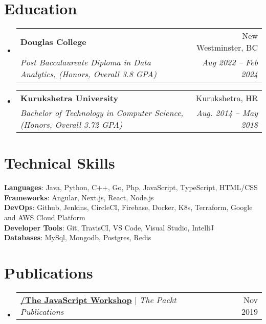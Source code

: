 \documentclass[letterpaper,11pt]{article}
\makeatletter
\newcommand{\resumeSubheading}[4]{
  \vspace{-2pt}\item
    \begin{tabular*}{0.97\textwidth}[t]{l@{\extracolsep{\fill}}r}
      \textbf{#1} & #2 \\
      \textit{\small#3} & \textit{\small #4} \\
    \end{tabular*}\vspace{-7pt}
}
\newcommand{\resumeProjectHeading}[2]{
    \item
    \begin{tabular*}{0.97\textwidth}{l@{\extracolsep{\fill}}r}
      \small#1 & #2 \\
    \end{tabular*}\vspace{-7pt}
}
\newcommand{\resumeSubHeadingListStart}{\begin{itemize}[leftmargin=0.15in, label={}]}
\newcommand{\resumeSubHeadingListEnd}{\end{itemize}}
\makeatother
\begin{document}
\section{Education}
  \resumeSubHeadingListStart
    \resumeSubheading
      {Douglas College}{New Westminster, BC}
      {Post Baccalaureate Diploma in Data Analytics, (Honors, Overall 3.8 GPA)}{Aug 2022 -- Feb 2024}
    \resumeSubheading
      {Kurukshetra University}{Kurukshetra, HR}
      {Bachelor of Technology in Computer Science, (Honors, Overall 3.72 GPA)}{Aug. 2014 -- May 2018}
  \resumeSubHeadingListEnd

%
\section{Technical Skills}
 \begin{itemize}[leftmargin=0.15in, label={}]
    \small{\item{
     \textbf{Languages}{: Java, Python, C++, Go, Php, JavaScript, TypeScript, HTML/CSS} \\
     \textbf{Frameworks}{: Angular, Next.js, React, Node.js} \\
     \textbf{DevOps}{: Github, Jenkins, CircleCI, Firebase, Docker, K8s, Terraform, Google and AWS Cloud Platform} \\
     \textbf{Developer Tools}{: Git, TravisCI, VS Code, Visual Studio, IntelliJ} \\
     \textbf{Databases}{: MySql, Mongodb, Postgres, Redis}
    }}
 \end{itemize}

\section{Publications}
\resumeSubHeadingListStart
    \resumeProjectHeading
        {\textbf{\href{https://www.packtpub.com/product/the-javascript-workshop/9781838641917}{/The JavaScript Workshop}} $|$ \emph{The Packt Publications}}{Nov 2019}
        {}{}
\resumeSubHeadingListEnd
 
\end{document}
